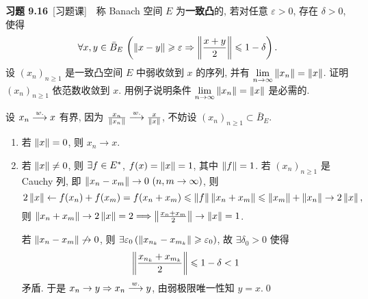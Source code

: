    \textbf{习题 9.16}\ [习题课]\ \ 称 Banach 空间 $ E $ 为\textbf{一致凸}的, 若对任意 $ \varepsilon>0 $, 存在 $ \delta>0 $, 使得
    \[
        \forall x, y\in\bar{B}_{E}\,\left(\left\| x-y \right\|\geqslant\varepsilon\Rightarrow \left\| \frac{x+y}{2} \right\|\leqslant 1-\delta\right).
    \]
    设 $ (x_{n})_{n\geqslant1} $ 是一致凸空间 $ E $ 中弱收敛到 $ x $ 的序列, 并有 $ \lim\limits_{n\to\infty}\left\| x_{n} \right\|=\left\| x \right\| $. 证明 $ (x_{n})_{n\geqslant1} $ 依范数收敛到 $ x $. 用例子说明条件 $ \lim\limits_{n\to\infty}\left\| x_{n} \right\|=\left\| x \right\| $ 是必需的.
    \begin{Proof}
        设 $ x_{n}\overset{w.}{\longrightarrow} x $ 有界, 因为 $ \frac{x_{n}}{\left\| x_{n} \right\|}\overset{w.}{\longrightarrow}\frac{x}{\left\| x \right\|} $, 不妨设 $ (x_{n})_{n\geqslant1}\subset\bar{B}_{E} $.
        \begin{enumerate}[(1)]
            \item 若 $ \left\| x \right\|=0 $, 则 $ x_{n}\to x $.
            \item 若 $ \left\| x \right\|\ne 0 $, 则 $ \exists f\in E^{*} $, $ f(x)=\left\| x \right\|=1 $, 其中 $ \left\| f \right\|=1 $. 若 $ (x_{n})_{n\geqslant1} $ 是 Cauchy 列, 即 $ \norm{x_{n}- x_{m}}\to 0\ (n, m\to\infty) $, 则
            \[
                2\left\| x \right\|\leftarrow f(x_{n})+f(x_{m})=f(x_{n}+x_{m})\leqslant\left\| f \right\|\left\| x_{n}+x_{m} \right\|\leqslant\left\| x_{m} \right\|+\left\| x_{n} \right\|\to 2\left\| x \right\|,
            \]
            则 $ \left\| x_{n}+x_{m} \right\|\to 2\left\| x \right\|=2\Longrightarrow \left\| \frac{x_{n}+x_{m}}{2} \right\|\to \left\| x \right\|=1 $.

            若 $ \left\| x_{n}-x_{m} \right\|\not\to 0 $, 则 $ \exists\varepsilon_{0}\,(\left\| x_{n_{k}}-x_{m_{k}} \right\|\geqslant\varepsilon_{0}) $, 故 $ \exists \delta_{0}>0 $ 使得
            \[
                \left\| \frac{x_{n_{k}}+x_{m_{k}}}{2} \right\|\leqslant1-\delta<1
            \]
            矛盾. 于是 $ x_{n}\to y\Rightarrow x_{n}\overset{w.}{\longrightarrow} y $, 由弱极限唯一性知 $ y=x $.\qed
        \end{enumerate}
    \end{Proof}

